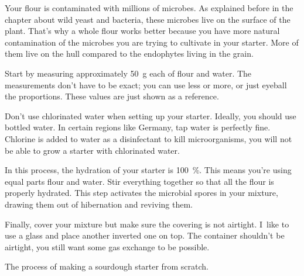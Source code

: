 Your flour is contaminated with millions of microbes. As explained
before in the chapter about wild yeast and bacteria, these
microbes live on the surface of the plant. That's why
a whole flour works better because you have more natural
contamination of the microbes you are trying to cultivate
in your starter. More of them live on the hull compared to the
endophytes living in the grain.

Start by measuring approximately \qty{50}{\gram} each of flour and
water. The measurements don't have to be exact; you can use
less or more, or just eyeball the proportions. These
values are just shown as a reference.

Don't use chlorinated water when setting up your starter.
Ideally, you should use bottled water. In certain regions
like Germany, tap water is perfectly fine. Chlorine is added
to water as a disinfectant to kill microorganisms, you will
not be able to grow a starter with chlorinated water.

In this process, the hydration of your starter is \qty{100}{\percent}.
This means you're using equal parts flour and
water. Stir everything together so that all the flour is
properly hydrated. This step activates the microbial spores
in your mixture, drawing them out of hibernation and
reviving them.

Finally, cover your mixture but make sure the covering is
not airtight. I~like to use a glass and place another
inverted one on top. The container shouldn't be airtight,
you still want some gas exchange to be possible.

\begin{flowchart}[!htb]
\begin{center}
  
  \caption[Process for starter from scratch]{The process of making a sourdough
      starter from scratch.}%
  \label{fig:sourdough-starter-process}
\end{center}
\end{flowchart}

